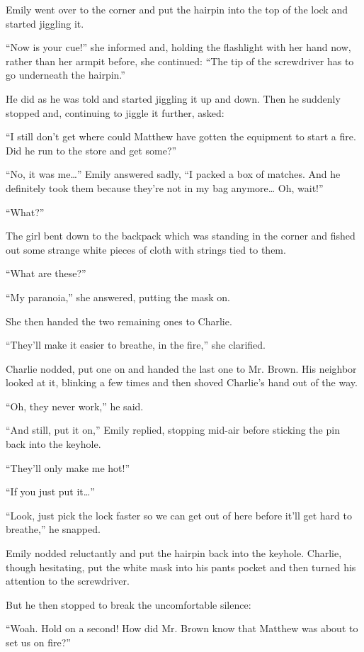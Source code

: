 Emily went over to the corner and put the hairpin into the top of the lock and started jiggling it.

“Now is your cue!” she informed and, holding the flashlight with her hand now, rather than her armpit before, she continued: “The tip of the screwdriver has to go underneath the hairpin.”

He did as he was told and started jiggling it up and down. Then he suddenly stopped and, continuing to jiggle it further, asked:

“I still don't get where could Matthew have gotten the equipment to start a fire. Did he run to the store and get some?”

“No, it was me…” Emily answered sadly, “I packed a box of matches. And he definitely took them because they're not in my bag anymore… Oh, wait!”

“What?”

The girl bent down to the backpack which was standing in the corner and fished out some strange white pieces of cloth with strings tied to them.

“What are these?”

“My paranoia,” she answered, putting the mask on.

She then handed the two remaining ones to Charlie.

“They'll make it easier to breathe, in the fire,” she clarified.

Charlie nodded, put one on and handed the last one to Mr. Brown. His neighbor looked at it, blinking a few times and then shoved Charlie's hand out of the way.

“Oh, they never work,” he said.

“And still, put it on,” Emily replied, stopping mid-air before sticking the pin back into the keyhole.

“They'll only make me hot!”

“If you just put it…”

“Look, just pick the lock faster so we can get out of here before it'll get hard to breathe,” he snapped.

Emily nodded reluctantly and put the hairpin back into the keyhole. Charlie, though hesitating, put the white mask into his pants pocket and then turned his attention to the screwdriver.

But he then stopped to break the uncomfortable silence:

“Woah. Hold on a second! How did Mr. Brown know that Matthew was about to set us on fire?”

